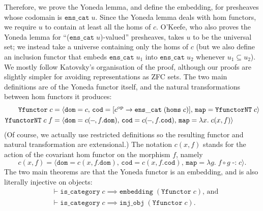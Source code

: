 \documentclass[twoside,titlepage,11pt]{article}
\begin{document}
Therefore, we prove the Yoneda lemma, and define the embedding, for presheaves whose codomain is $\mathtt{ens\_cat}\;u$.
Since the Yoneda lemma deals with hom functors, we require $u$ to contain at least all the homs of $c$.
O'Keefe, who also proves the Yoneda lemma for ``($\mathtt{ens\_cat}\;u$)-valued'' presheaves, takes $u$ to be the universal set; we instead take a universe containing only the homs of $c$ (but we also define an inclusion functor that embeds $\mathtt{ens\_cat}\;u_1$ into $\mathtt{ens\_cat}\;u_2$ whenever $u_1\subseteq u_2$).
We mostly follow Katovsky's organisation of the proof, although our proofs are slightly simpler for avoiding representations as ZFC sets.
The two main definitions are of the Yoneda functor itself, and the natural transformations between hom functors it produces:
\begin{align*}
\mathtt{Yfunctor}\;c&=\langle\mathtt{dom}=c,\,\mathtt{cod}=[c\op\to\mathtt{ens\_cat}\;(\mathtt{homs}\;c)],\,\mathtt{map}=\mathtt{YfunctorNT}\;c\rangle\\
\mathtt{YfunctorNT}\;c\;f&=\langle\mathtt{dom}=c(\blank,f.\mathtt{dom}),\,\mathtt{cod}=c(\blank,f.\mathtt{cod}),\,\mathtt{map}=\lambda{x}.\;c(x,f)\rangle
\end{align*}
(Of course, we actually use restricted definitions so the resulting functor and natural transformation are extensional.)
The notation $c(x,f)$ stands for the action of the covariant hom functor on the morphism $f$, namely \[c(x,f)=\langle\mathtt{dom}=c(x,f.\mathtt{dom}),\,\mathtt{cod}=c(x,f.\mathtt{cod}),\,\mathtt{map}=\lambda{g}.\;f\circ g\operatorname{\mathtt{-:}}c\rangle\text{.}\]
The two main theorems are that the Yoneda functor is an embedding, and is also literally injective on objects:
\begin{align*}
&\vdash\mathtt{is\_category}\;c\implies\mathtt{embedding}\;(\mathtt{Yfunctor}\;c)\text{, and}\\
&\vdash\mathtt{is\_category}\;c\implies\mathtt{inj\_obj}\;(\mathtt{Yfunctor}\;c)\text{.}
\end{align*}
\end{document}
